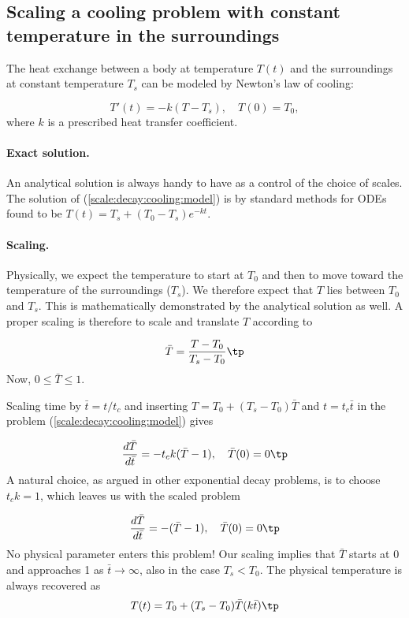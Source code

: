 \documentclass[graybox,envcountchap,sectrefs,final]{svmonodo}
\begin{document}
\subsection{Scaling a cooling problem with constant temperature in the surroundings}
\label{scale:decay:cooling:const}

The heat exchange between a body at temperature $T(t)$ and the
surroundings at constant temperature $T_s$
can be modeled by Newton's law of cooling:

\begin{equation}
T'(t) = -k(T-T_s),\quad T(0)=T_0,
\label{scale:decay:cooling:model}
\end{equation}
where $k$ is a prescribed heat transfer coefficient.

\paragraph{Exact solution.}
An analytical solution is always handy to have as a control of the
choice of scales. The solution of (\ref{scale:decay:cooling:model})
is by standard methods for ODEs found to be
$T(t) = T_s + (T_0 - T_s)e^{-kt}$.

\paragraph{Scaling.}
Physically, we expect the temperature to start at $T_0$ and then to
move toward the temperature of the surroundings ($T_s$). We therefore
expect that $T$ lies between $T_0$ and $T_s$. This is mathematically
demonstrated by the analytical solution as well. A proper scaling is
therefore to scale and translate $T$ according to

\begin{equation}
\bar T = \frac{T-T_0}{T_s-T_0}
\label{scale:decay:cooling:Tbar}
\tp
\end{equation}
Now, $0\leq \bar T\leq 1$.

Scaling time by $\bar t = t/t_c$ and inserting
$T= T_0 + (T_s-T_0)\bar T$ and $t=t_c\bar t$ in the
problem (\ref{scale:decay:cooling:model}) gives

\[ \frac{d\bar T}{d\bar t} = - t_ck(\bar T - 1),\quad \bar T(0) = 0
\tp
\]
A natural choice, as argued in other exponential decay problems,
is to choose $t_ck=1$, which leaves us with the scaled problem

\begin{equation}
\frac{d\bar T}{d\bar t} = - (\bar T - 1),\quad \bar T(0)=0
\label{scale:decay:cooling:Tbar:eq}
\tp
\end{equation}
No physical parameter enters this problem!
Our scaling implies that $\bar T$ starts at
0 and approaches 1 as $\bar t\rightarrow\infty$, also in the case
$T_s < T_0$. The physical temperature is always recovered as
\begin{equation}
T(t) = T_0 + (T_s-T_0)\bar T (k\bar t)
\label{scale:decay:cooling:T}
\tp
\end{equation}
\end{document}
